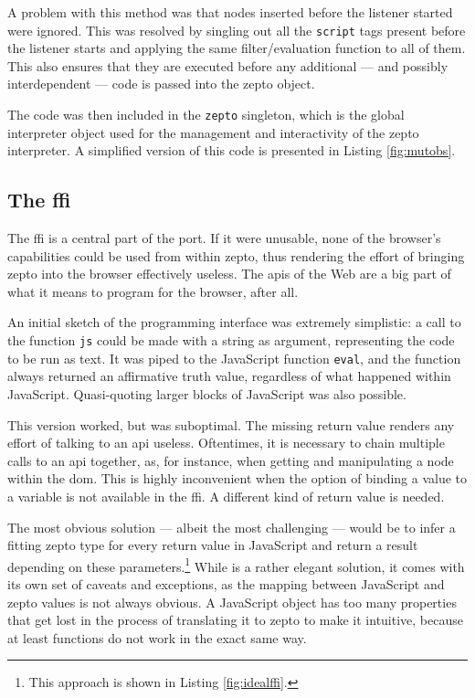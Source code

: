 \documentclass[oneside,11pt,xetex]{scrbook}
\begin{document}
A problem with this method was that nodes inserted before the listener started were ignored.
This was resolved by singling out all the \texttt{script} tags present before the listener
starts and applying the same filter/evaluation function to all of them. This also ensures
that they are executed before any additional --- and possibly interdependent --- code is
passed into the zepto object.

The code was then included in the \texttt{zepto} singleton, which is the global interpreter object
used for the management and interactivity of the zepto interpreter. A simplified version of this
code is presented in Listing \ref{fig:mutobs}.

\subsection{The \gls{ffi}}
\label{sec:ffi}

The \gls{ffi} is a central part of the port. If it were unusable, none of the browser's
capabilities could be used from within zepto, thus rendering the effort of bringing zepto into
the browser effectively useless. The \gls{api}s of the Web are a big part of what it means to
program for the browser, after all.

An initial sketch of the programming interface was extremely simplistic: a call to the
function \texttt{js} could be made with a string as argument, representing the code to
be run as text. It was piped to the JavaScript function
\texttt{eval}, and the function always returned an affirmative truth value, regardless of
what happened within JavaScript. Quasi-quoting larger blocks of JavaScript was also possible.

This version worked, but was suboptimal. The missing return value renders any effort of talking to
an \gls{api} useless. Oftentimes, it is necessary to chain multiple calls to an \gls{api} together,
as, for instance, when getting and manipulating a node within the \gls{dom}. This is highly
inconvenient when the option of binding a value to a variable is not available in the \gls{ffi}.
A different kind of return value is needed.

The most obvious solution --- albeit the most challenging --- would be to infer a fitting zepto
type for every return value in JavaScript and return a result depending on these
parameters.\footnote{This approach is shown in Listing \ref{fig:idealffi}.} While is a rather elegant
solution, it comes with its own set of caveats and exceptions, as the mapping between JavaScript
and zepto values is not always obvious. A JavaScript object has too many properties that get
lost in the process of translating it to zepto to make it intuitive, because at least functions
do not work in the exact same way.
\end{document}
